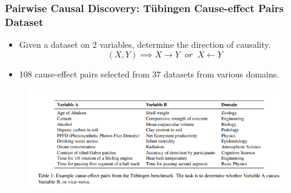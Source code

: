 \documentclass{beamer}
\begin{document}
\begin{frame}
	\frametitle{Pairwise Causal Discovery: T\"{u}bingen Cause-effect Pairs Dataset}
	\begin{itemize}
		\item Given a dataset on $ 2 $ variables, determine the direction of causality.
			$$ (X, Y) \implies X \rightarrow Y \;\; \textit{or} \; \; X \leftarrow Y $$
		\item 108 cause-effect pairs selected from 37 datasets from
			various domains.
	\end{itemize}
	\begin{figure}
		\centering
		\includegraphics[scale=0.5]{imgs/table1.png}
	\end{figure}
\end{frame}
\end{document}

